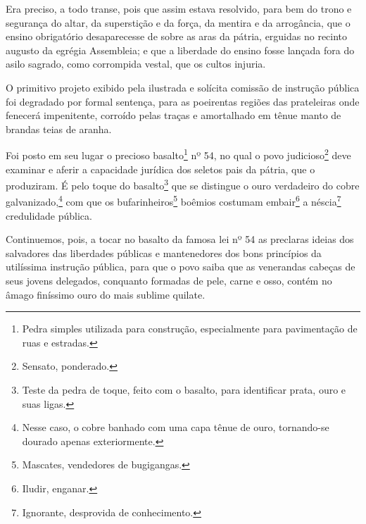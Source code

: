 Era preciso, a todo transe, pois que assim estava resolvido, para bem do
trono e segurança do altar, da superstição e da força, da mentira e da
arrogância, que o ensino obrigatório desaparecesse de sobre as aras da
pátria, erguidas no recinto augusto da egrégia Assembleia; e que a
liberdade do ensino fosse lançada fora do asilo sagrado, como corrompida
vestal, que os cultos injuria.

O primitivo projeto exibido pela ilustrada e solícita comissão de
instrução pública foi degradado por formal sentença, para as poeirentas
regiões das prateleiras onde fenecerá impenitente, corroído pelas traças
e amortalhado em tênue manto de brandas teias de aranha.

Foi posto em seu lugar o precioso basalto\footnote{Pedra simples
  utilizada para construção, especialmente para pavimentação de ruas e
  estradas.} nº 54, no qual o povo judicioso\footnote{Sensato,
  ponderado.} deve examinar e aferir a capacidade jurídica dos seletos
pais da pátria, que o produziram. É pelo toque do basalto\footnote{
  Teste da pedra de toque, feito com o basalto, para identificar prata,
  ouro e suas ligas.} que se distingue o ouro verdadeiro do cobre
galvanizado,\footnote{Nesse caso, o cobre banhado com uma capa tênue de
  ouro, tornando-se dourado apenas exteriormente.} com que os
bufarinheiros\footnote{Mascates, vendedores de bugigangas.} boêmios
costumam embair\footnote{Iludir, enganar.} a néscia\footnote{
  Ignorante, desprovida de conhecimento.} credulidade pública.

Continuemos, pois, a tocar no basalto da famosa lei nº 54 as preclaras
ideias dos salvadores das liberdades públicas e mantenedores dos bons
princípios da utilíssima instrução pública, para que o povo saiba que as
venerandas cabeças de seus jovens delegados, conquanto formadas de pele,
carne e osso, contém no âmago finíssimo ouro do mais sublime quilate.

